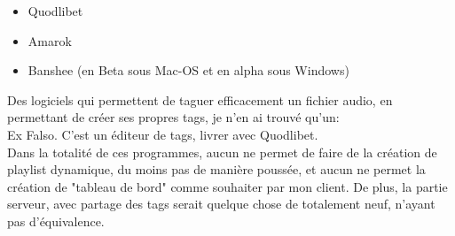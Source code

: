 \documentclass[a4paper,12pt]{report}
\begin{document}
\begin{itemize}
\item Quodlibet
\item Amarok
\item Banshee (en Beta sous Mac-OS et en alpha sous Windows)
\end{itemize}

Des logiciels qui permettent de taguer efficacement un fichier audio, en permettant de créer ses propres tags, je n'en ai trouvé qu'un:\\

Ex Falso.
C'est un éditeur de tags, livrer avec Quodlibet.\\

Dans la totalité de ces programmes, aucun ne permet de faire de la création de playlist dynamique, du moins pas de manière poussée, et aucun ne permet la création de "tableau de bord" comme souhaiter par mon client.
De plus, la partie serveur, avec partage des tags serait quelque chose de totalement neuf, n'ayant pas d'équivalence.
\end{document}
